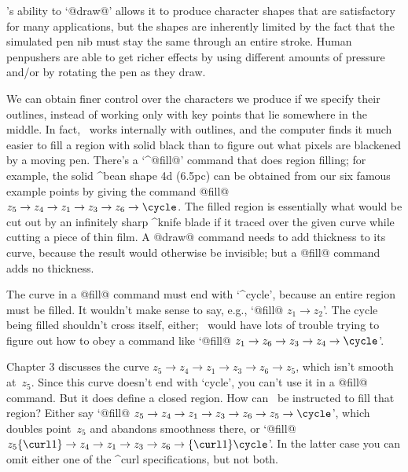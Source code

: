 \endgroup %

\MF's ability to `@draw@' allows it to produce character shapes that are
satisfactory for many applications, but the shapes are inherently limited
by the fact that the simulated pen nib must stay the same through an
entire stroke. Human penpushers are able to get richer effects by
using different amounts of pressure and/or by rotating the pen as they draw.

We can obtain finer control over the characters we produce if we specify
their outlines, instead of working only with key points that lie somewhere
in the middle.  In fact, \MF\ works internally with outlines, and the
computer finds it much easier to fill a region with solid black than to
figure out what pixels are blackened by a moving pen. There's a `^@fill@'
command that does region filling; for example, the solid ^{bean} shape
\displayfig 4d (6.5pc)
can be obtained from our six famous example points by giving the command
\begindisplay
@fill@ $z_5\to z_4\to z_1\to z_3\to z_6\to \cycle$.
\enddisplay
The filled region is essentially what would be cut out by an
infinitely sharp ^{knife} blade if it traced over the given curve while
cutting a piece of thin film. A @draw@ command needs to add thickness to
its curve, because the result would otherwise be invisible; but a @fill@
command adds no thickness.

The curve in a @fill@ command must end with `^{cycle}', because an
entire region must be filled. It wouldn't make sense to say, e.g.,
`@fill@ $z_1\to z_2$'. The cycle being filled shouldn't cross itself,
either; \MF\ would have lots of trouble trying to figure out how to
obey a command like `@fill@ $z_1\to z_6\to z_3\to z_4\to\cycle$'.

\dangerexercise Chapter 3 discusses the curve $z_5\to z_4\to z_1\to
z_3\to z_6\to z_5$, which isn't smooth at~$z_5$. Since this curve
doesn't end with `cycle', you can't use it in a @fill@ command.
But it does define a closed region. How can \MF\ be instructed
to fill that region?
\answer Either say `@fill@ $z_5\to z_4\to z_1\to z_3\to z_6\to z_5\to
\cycle$', which doubles point~$z_5$ and abandons smoothness there,
or `@fill@ $z_5\{\curl1\}\to z_4\to z_1\to z_3\to z_6\to
\{\curl1\}\cycle$'. In the latter case you can omit either one of
the ^{curl} specifications, but not both.

